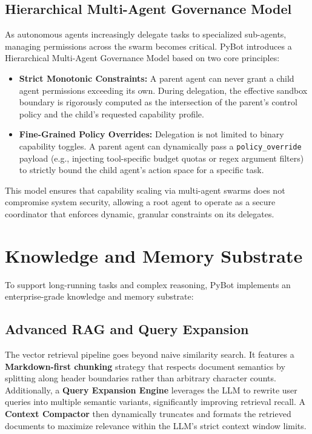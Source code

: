 \documentclass[11pt,a4paper]{article}
\begin{document}
\subsection{Hierarchical Multi-Agent Governance Model}

As autonomous agents increasingly delegate tasks to specialized sub-agents, managing permissions across the swarm becomes critical. PyBot introduces a Hierarchical Multi-Agent Governance Model based on two core principles:
\begin{itemize}
  \item \textbf{Strict Monotonic Constraints:} A parent agent can never grant a child agent permissions exceeding its own. During delegation, the effective sandbox boundary is rigorously computed as the intersection of the parent's control policy and the child's requested capability profile.
  \item \textbf{Fine-Grained Policy Overrides:} Delegation is not limited to binary capability toggles. A parent agent can dynamically pass a \texttt{policy\_override} payload (e.g., injecting tool-specific budget quotas or regex argument filters) to strictly bound the child agent's action space for a specific task.
\end{itemize}
This model ensures that capability scaling via multi-agent swarms does not compromise system security, allowing a root agent to operate as a secure coordinator that enforces dynamic, granular constraints on its delegates.

\section{Knowledge and Memory Substrate}
\label{sec:knowledge}

To support long-running tasks and complex reasoning, PyBot implements an enterprise-grade knowledge and memory substrate:

\subsection{Advanced RAG and Query Expansion}
The vector retrieval pipeline goes beyond naive similarity search. It features a \textbf{Markdown-first chunking} strategy that respects document semantics by splitting along header boundaries rather than arbitrary character counts. Additionally, a \textbf{Query Expansion Engine} leverages the LLM to rewrite user queries into multiple semantic variants, significantly improving retrieval recall. A \textbf{Context Compactor} then dynamically truncates and formats the retrieved documents to maximize relevance within the LLM's strict context window limits.
\end{document}
